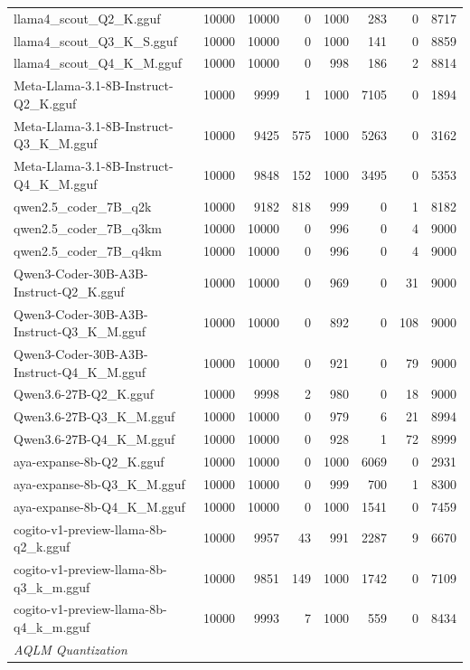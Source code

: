 \begin{table}[htbp]
{\begin{tabular}{lrrrrrrr}
    llama4\_scout\_Q2\_K.gguf & 10000 & 10000 & 0 & 1000 & 283 & 0 & 8717 \\
    llama4\_scout\_Q3\_K\_S.gguf & 10000 & 10000 & 0 & 1000 & 141 & 0 & 8859 \\
    llama4\_scout\_Q4\_K\_M.gguf & 10000 & 10000 & 0 & 998 & 186 & 2 & 8814 \\
    Meta-Llama-3.1-8B-Instruct-Q2\_K.gguf & 10000 & 9999 & 1 & 1000 & 7105 & 0 & 1894 \\
    Meta-Llama-3.1-8B-Instruct-Q3\_K\_M.gguf & 10000 & 9425 & 575 & 1000 & 5263 & 0 & 3162 \\
    Meta-Llama-3.1-8B-Instruct-Q4\_K\_M.gguf & 10000 & 9848 & 152 & 1000 & 3495 & 0 & 5353 \\
    qwen2.5\_coder\_7B\_q2k & 10000 & 9182 & 818 & 999 & 0 & 1 & 8182 \\
    qwen2.5\_coder\_7B\_q3km & 10000 & 10000 & 0 & 996 & 0 & 4 & 9000 \\
    qwen2.5\_coder\_7B\_q4km & 10000 & 10000 & 0 & 996 & 0 & 4 & 9000 \\
    Qwen3-Coder-30B-A3B-Instruct-Q2\_K.gguf & 10000 & 10000 & 0 & 969 & 0 & 31 & 9000 \\
    Qwen3-Coder-30B-A3B-Instruct-Q3\_K\_M.gguf & 10000 & 10000 & 0 & 892 & 0 & 108 & 9000 \\
    Qwen3-Coder-30B-A3B-Instruct-Q4\_K\_M.gguf & 10000 & 10000 & 0 & 921 & 0 & 79 & 9000 \\
    Qwen3.6-27B-Q2\_K.gguf & 10000 & 9998 & 2 & 980 & 0 & 18 & 9000 \\
    Qwen3.6-27B-Q3\_K\_M.gguf & 10000 & 10000 & 0 & 979 & 6 & 21 & 8994 \\
    Qwen3.6-27B-Q4\_K\_M.gguf & 10000 & 10000 & 0 & 928 & 1 & 72 & 8999 \\
    aya-expanse-8b-Q2\_K.gguf & 10000 & 10000 & 0 & 1000 & 6069 & 0 & 2931 \\
    aya-expanse-8b-Q3\_K\_M.gguf & 10000 & 10000 & 0 & 999 & 700 & 1 & 8300 \\
    aya-expanse-8b-Q4\_K\_M.gguf & 10000 & 10000 & 0 & 1000 & 1541 & 0 & 7459 \\
    cogito-v1-preview-llama-8b-q2\_k.gguf & 10000 & 9957 & 43 & 991 & 2287 & 9 & 6670 \\
    cogito-v1-preview-llama-8b-q3\_k\_m.gguf & 10000 & 9851 & 149 & 1000 & 1742 & 0 & 7109 \\
    cogito-v1-preview-llama-8b-q4\_k\_m.gguf & 10000 & 9993 & 7 & 1000 & 559 & 0 & 8434 \\
    \midrule
    \multicolumn{8}{l}{\textit{AQLM Quantization}} \\

\end{tabular}}
\end{table}
